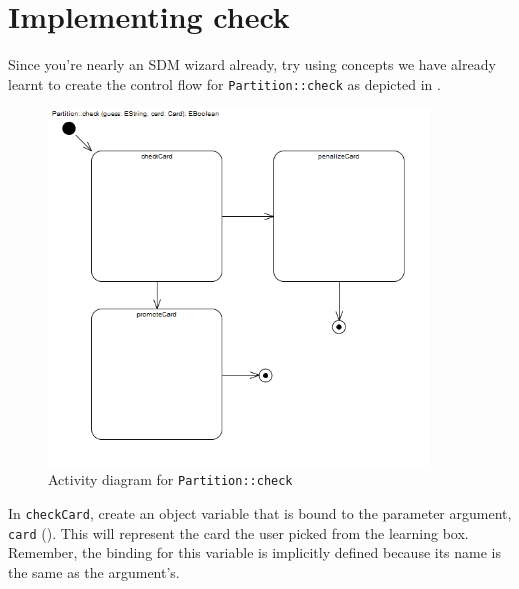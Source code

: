 \newpage
\hypertarget{checkCard vis}{}
\section{Implementing check}
\label{sec: Implementing check}
\genHeader

\begin{stepbystep}

\vspace{1cm}

\item Since you're nearly an SDM wizard already, try using concepts we have already learnt to create the control flow for
\texttt{Partition::check} as depicted in .

\vspace{1cm}

\begin{figure}[htbp]
\begin{center}
  \includegraphics[width=0.9\textwidth]{../../org.moflon.doc.handbook.03_storyDiagrams/04_checkCard/visCheImages/ea_activityCheck}
  \caption{Activity diagram for \texttt{Partition::check}}
  \label{ea:sdm_check_start}
\end{center}
\end{figure}

\vspace{1cm}

\item In \texttt{checkCard}, create an object variable that is bound to the parameter argument, \texttt{card} 
(). This will represent the card the user picked from the learning box. Remember, the binding for this variable is implicitly
defined because its name is the same as the argument's.


\end{stepbystep}
